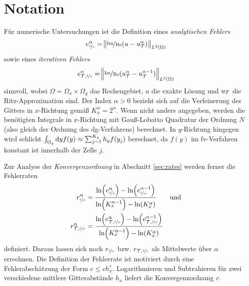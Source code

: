 \section{Notation}\label{sec:notation_4}
Für numerische Untersuchungen ist die Definition eines \emph{analytischen Fehlers} 
\begin{equation}
  e_{\nicefrac{i}{r}}^{\alpha} = \norm{\nicefrac{\operatorname{Im}}{\operatorname{Re}} (u - u_{\mathcal{T}}^{\alpha})}_{L^2(\Omega)}
  \label{eq:error_ana}
\end{equation}
sowie eines \emph{iterativen Fehlers}
\begin{equation*}
  e_{\mathcal{T}, \nicefrac{i}{r}}^{\alpha} = \norm{\nicefrac{\operatorname{Im}}{\operatorname{Re}} (u_{\mathcal{T}}^{\alpha} - u_{\mathcal{T}}^{\alpha-1})}_{L^2(\Omega)}
\end{equation*}
sinnvoll, wobei $\Omega=\Omega_x \times \Omega_y$ das Rechengebiet, $u$ die exakte Lösung und $u_{\mathcal{T}}$ die Ritz-Approximation sind. Der Index $\alpha>0$ bezieht sich auf die Verfeinerung des Gitters in $x$-Richtung gemäß $K_x^{\alpha} = 2^\alpha$. Wenn nicht anders angegeben, werden die benötigten Integrale in $x$-Richtung mit Gauß-Lobatto Quadratur der Ordnung $N$ (also gleich der Ordnung des \ac{dg}-Verfahrens) berechnet.
In $y$-Richtung hingegen wird schlicht $\int_{\Omega_y}\mathop{}\!\mathrm{d} y f(y) \approx \sum_{j=1}^{K_y} h_y f(y_j)$ berechnet, da $f(y)$ im \ac{fv}-Verfahren konstant ist innerhalb der Zelle $j$.

Zur Analyse der \emph{Konvergenzordnung} in Abschnitt \ref{sec:rates} werden ferner die Fehlerraten
\begin{equation}
  \begin{aligned}
    r_{\nicefrac{i}{r}}^{\alpha} &= \frac{\ln(e_{\nicefrac{i}{r}}^{\alpha}) - \ln(e_{\nicefrac{i}{r}}^{\alpha-1})}{\ln(K_x^{\alpha-1}) - \ln(K_x^{\alpha})} \qquad\text{und}\\
    r_{\mathcal{T},\nicefrac{i}{r}}^{\alpha} &= \frac{\ln(e_{\mathcal{T},\nicefrac{i}{r}}^{\alpha}) - \ln(e_{\mathcal{T},\nicefrac{i}{r}}^{\alpha-1})}{\ln(K_x^{\alpha-1}) - \ln(K_x^{\alpha})}
  \end{aligned}
  \label{eq:fehlerraten}
\end{equation}
definiert. Daraus lassen sich noch $r_{\nicefrac{i}{r}}$ bzw. $r_{\mathcal{T},\nicefrac{i}{r}}$ als Mittelwerte über $\alpha$ errechnen. Die Definition der Fehlerrate ist motiviert durch eine Fehlerabschätzung der Form ${e \leq ch_x^r}$. Logarithmieren und Subtrahieren für zwei verschiedene mittlere Gitterabstände $h_x$ liefert die Konvergenzordnung $r$.

